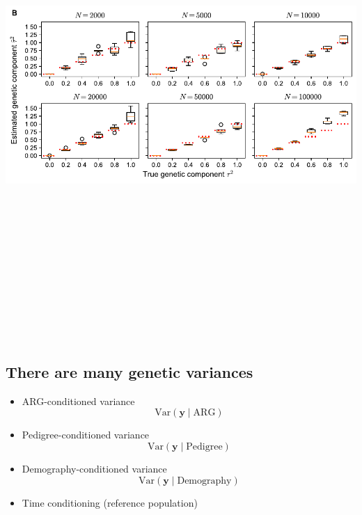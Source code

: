 \documentclass[
  letterpaper,
  DIV=11,
  numbers=noendperiod]{scrartcl}
\providecommand{\tightlist}{%
  \setlength{\itemsep}{0pt}\setlength{\parskip}{0pt}}\usepackage{longtable,booktabs,array}
\begin{document}
\includegraphics[width=\linewidth,height=7.29167in,keepaspectratio]{slides_files/mediabag/imgs/estimation_infer.pdf}

\subsection{There are many genetic
variances}\label{there-are-many-genetic-variances}

\begin{itemize}
\tightlist
\item
  ARG-conditioned variance \[
  \mathrm{Var}(\mathbf{y} \mid \mathrm{ARG})
  \]
\item
  Pedigree-conditioned variance \[
  \mathrm{Var}(\mathbf{y} \mid \mathrm{Pedigree})
  \]
\item
  Demography-conditioned variance \[
  \mathrm{Var}(\mathbf{y} \mid \mathrm{Demography})
  \]
\item
  Time conditioning (reference population)
\end{itemize}
\end{document}
